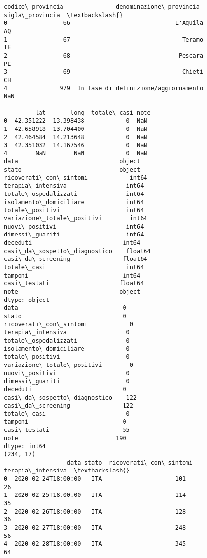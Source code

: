 \documentclass[11pt]{article}
\begin{document}
\begin{Verbatim}[commandchars=\\\{\}]
   codice\_provincia               denominazione\_provincia sigla\_provincia  \textbackslash{}
0                66                              L'Aquila              AQ
1                67                                Teramo              TE
2                68                               Pescara              PE
3                69                                Chieti              CH
4               979  In fase di definizione/aggiornamento             NaN

         lat       long  totale\_casi note
0  42.351222  13.398438            0  NaN
1  42.658918  13.704400            0  NaN
2  42.464584  14.213648            0  NaN
3  42.351032  14.167546            0  NaN
4        NaN        NaN            0  NaN
data                             object
stato                            object
ricoverati\_con\_sintomi            int64
terapia\_intensiva                 int64
totale\_ospedalizzati              int64
isolamento\_domiciliare            int64
totale\_positivi                   int64
variazione\_totale\_positivi        int64
nuovi\_positivi                    int64
dimessi\_guariti                   int64
deceduti                          int64
casi\_da\_sospetto\_diagnostico    float64
casi\_da\_screening               float64
totale\_casi                       int64
tamponi                           int64
casi\_testati                    float64
note                             object
dtype: object
data                              0
stato                             0
ricoverati\_con\_sintomi            0
terapia\_intensiva                 0
totale\_ospedalizzati              0
isolamento\_domiciliare            0
totale\_positivi                   0
variazione\_totale\_positivi        0
nuovi\_positivi                    0
dimessi\_guariti                   0
deceduti                          0
casi\_da\_sospetto\_diagnostico    122
casi\_da\_screening               122
totale\_casi                       0
tamponi                           0
casi\_testati                     55
note                            190
dtype: int64
(234, 17)
                  data stato  ricoverati\_con\_sintomi  terapia\_intensiva  \textbackslash{}
0  2020-02-24T18:00:00   ITA                     101                 26
1  2020-02-25T18:00:00   ITA                     114                 35
2  2020-02-26T18:00:00   ITA                     128                 36
3  2020-02-27T18:00:00   ITA                     248                 56
4  2020-02-28T18:00:00   ITA                     345                 64


\end{Verbatim}
\end{document}
